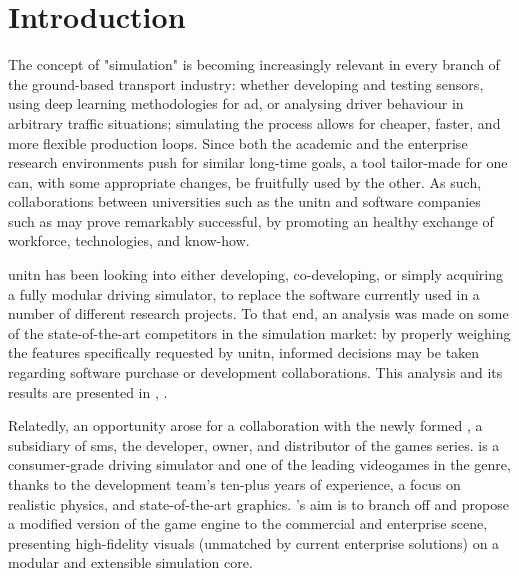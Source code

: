 \chapter*{Introduction}\label{ch:introduction}
\TOCsection{}

The concept of "simulation" is becoming increasingly relevant in every branch of the ground-based transport industry: whether developing and testing sensors, using deep learning methodologies for \gls{ad}, or analysing driver behaviour in arbitrary traffic situations; simulating the process allows for cheaper, faster, and more flexible production loops. Since both the academic and the enterprise research environments push for similar long-time goals, a tool tailor-made for one can, with some appropriate changes, be fruitfully used by the other. As such, collaborations between universities such as the \gls{unitn} and software companies such as  may prove remarkably successful, by promoting an healthy exchange of workforce, technologies, and know-how.

\gls{unitn} has been looking into either developing, co-developing, or simply acquiring a fully modular driving simulator, to replace the software currently used in a number of different research projects. To that end, an analysis was made on some of the state-of-the-art competitors in the simulation market: by properly weighing the \glspl{feature} specifically requested by \gls{unitn}, informed decisions may be taken regarding software purchase or development collaborations. This analysis and its results are presented in , .

Relatedly, an opportunity arose for a collaboration with the newly formed , a subsidiary of \gls{sms}, the developer, owner, and distributor of the  games series.  is a consumer-grade driving simulator and one of the leading videogames in the genre, thanks to the development team's ten-plus years of experience, a focus on realistic physics, and state-of-the-art graphics. 's aim is to branch off and propose a modified version of the game engine to the commercial and enterprise scene, presenting high-fidelity visuals (unmatched by current enterprise solutions) on a modular and extensible simulation core.

